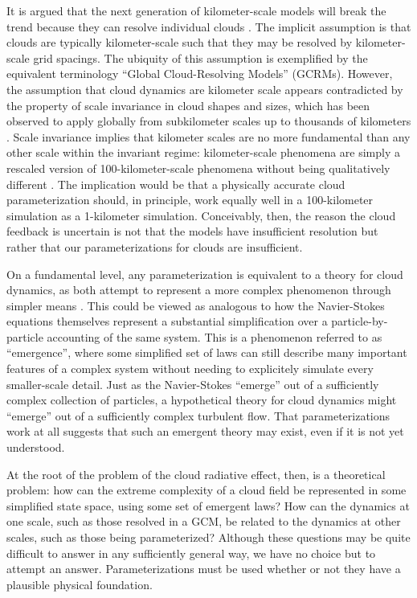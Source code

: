 \documentclass[acp, manuscript, english]{copernicus}
\begin{document}
It is argued that the next generation of kilometer-scale models will break the trend because they can resolve individual clouds \citep{slingo2022}. The implicit assumption is that clouds are typically kilometer-scale such that they may be resolved by kilometer-scale grid spacings. The ubiquity of this assumption is exemplified by the equivalent terminology ``Global Cloud-Resolving Models'' (GCRMs). However, the assumption that cloud dynamics are kilometer scale appears contradicted by the property of scale invariance in cloud shapes and sizes, which has been observed to apply globally from subkilometer scales up to thousands of kilometers \citep{wood2011,guillaume2018,dewitt2024,rees2024,dewitt2024b,dewitt2026}. Scale invariance implies that kilometer scales are no more fundamental than any other scale within the invariant regime: kilometer-scale phenomena are simply a rescaled version of 100-kilometer-scale phenomena without being qualitatively different \citep{lovejoy2013}. The implication would be that a physically accurate cloud parameterization should, in principle, work equally well in a 100-kilometer simulation as a 1-kilometer simulation. Conceivably, then, the reason the cloud feedback is uncertain is not that the models have insufficient resolution but rather that our parameterizations for clouds are insufficient. 


On a fundamental level, any parameterization is equivalent to a theory for cloud dynamics, as both attempt to represent a more complex phenomenon through simpler means \citep{arakawa2004}. This could be viewed as analogous to how the Navier-Stokes equations themselves represent a substantial simplification over a particle-by-particle accounting of the same system. This is a phenomenon referred to as ``emergence'', where some simplified set of laws can still describe many important features of a complex system without needing to explicitely simulate every smaller-scale detail. Just as the Navier-Stokes ``emerge'' out of a sufficiently complex collection of particles, a hypothetical theory for cloud dynamics might ``emerge'' out of a sufficiently complex turbulent flow. That parameterizations work at all suggests that such an emergent theory may exist, even if it is not yet understood.

At the root of the problem of the cloud radiative effect, then, is a theoretical problem: how can the extreme complexity of a cloud field be represented in some simplified state space, using some set of emergent laws? How can the dynamics at one scale, such as those resolved in a GCM, be related to the dynamics at other scales, such as those being parameterized? Although these questions may be quite difficult to answer in any sufficiently general way, we have no choice but to attempt an answer. Parameterizations must be used whether or not they have a plausible physical foundation.
\end{document}
